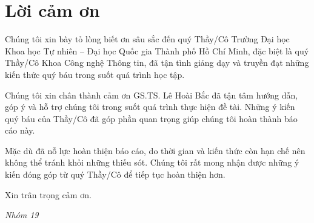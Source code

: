 \chapter*{Lời cảm ơn}

Chúng tôi xin bày tỏ lòng biết ơn sâu sắc đến quý Thầy/Cô Trường Đại học Khoa học Tự nhiên – Đại học Quốc gia Thành phố Hồ Chí Minh, đặc biệt là quý Thầy/Cô Khoa Công nghệ Thông tin, đã tận tình giảng dạy và truyền đạt những kiến thức quý báu trong suốt quá trình học tập.

Chúng tôi xin chân thành cảm ơn GS.TS. Lê Hoài Bắc đã tận tâm hướng dẫn, góp ý và hỗ trợ chúng tôi trong suốt quá trình thực hiện đề tài. Những ý kiến quý báu của Thầy/Cô đã góp phần quan trọng giúp chúng tôi hoàn thành báo cáo này.

Mặc dù đã nỗ lực hoàn thiện báo cáo, do thời gian và kiến thức còn hạn chế nên không thể tránh khỏi những thiếu sót. Chúng tôi rất mong nhận được những ý kiến đóng góp từ quý Thầy/Cô để tiếp tục hoàn thiện hơn.

Xin trân trọng cảm ơn.

\vspace{1.0cm}
\hfill \textit{Nhóm 19}
